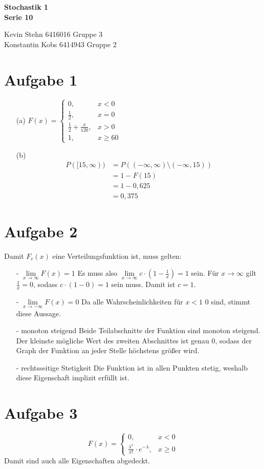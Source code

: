 \documentclass[10pt,a4paper]{article}
\begin{document}
\begin{center}
\textbf{Stochastik 1 \\ Serie 10 \\}
\end{center}

\begin{flushright}
Kevin Stehn 6416016 Gruppe 3 \\
Konstantin Kobs 6414943 Gruppe 2
\end{flushright}

\section*{Aufgabe 1}
\begin{itemize}
\item[(a)]
$ F(x)=\left\{\begin{array}{cl} 0, & x < 0\\ 
\frac{1}{2}, & x = 0 \\ 
\frac{1}{2}+\frac{x}{120}, & x > 0 \\
1 , & x \geq 60 \end{array}\right.$
\item[(b)]
\begin{align*}
P([15, \infty)) &= P((-\infty,\infty) \setminus (-\infty,15)) \\
&= 1 - F(15)\\
&= 1 - 0,625\\
&= 0,375
\end{align*}
\end{itemize}

\section*{Aufgabe 2}
Damit $F_c(x)$ eine Verteilungsfunktion ist, muss gelten:
\begin{itemize}
\item[-]$\lim\limits_{x \rightarrow \infty }{F(x)} = 1$ \qquad Es muss also $\lim\limits_{x \rightarrow \infty }{c \cdot (1-\frac{1}{x})} = 1$ sein. Für $x \rightarrow \infty$ gilt $\frac{1}{x}=0$, sodass $c \cdot (1-0) = 1$ sein muss. Damit ist $c=1$.
\item[-]$\lim\limits_{x \rightarrow -\infty }{F(x)} = 0$ \qquad Da alle Wahrscheinlichkeiten für $x < 1$ $0$ sind, stimmt diese Aussage.
\item[-]monoton steigend \qquad Beide Teilabschnitte der Funktion sind monoton steigend. Der kleinste mögliche Wert des zweiten Abschnittes ist genau $0$, sodass der Graph der Funktion an jeder Stelle höchstens größer wird.
\item[-]rechtsseitige Stetigkeit \qquad Die Funktion ist in allen Punkten stetig, weshalb diese Eigenschaft implizit erfüllt ist.
\end{itemize}
\section*{Aufgabe 3}
$$F(x)=\left\{\begin{array}{cl} 0, & x < 0\\ 
\frac{\lambda^x}{x!} \cdot e^{-\lambda}, & x \geq 0  \end{array}\right.$$
Damit sind auch alle Eigenschaften abgedeckt.\\
\end{document}
